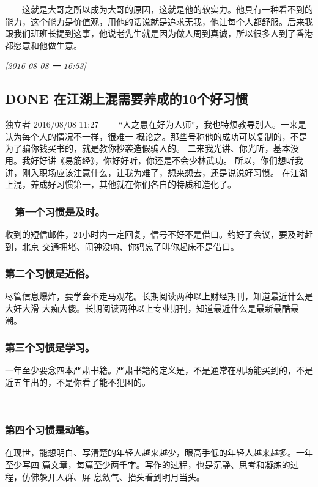 \documentclass[11pt]{ctexart}
\begin{document}
　　这就是大哥之所以成为大哥的原因，这就是他的软实力。他具有一种看不到的能力，这个能力是价值观，用他的话说就是追求无我，他让每个人都舒服。后来我跟我们班班长提到这事，他说老先生就是因为做人周到真诚，所以很多人到了香港都愿意和他做生意。

\textit{[2016-08-08 一 16:53]}

\subsection{{\bfseries\sffamily DONE} 在江湖上混需要养成的10个好习惯}
\label{sec:orgheadline67}
独立者    2016/08/08 11:27
　　“人之患在好为人师”，我也特烦教导别人。一来是认为每个人的情况不一样，很难一
概论之。那些号称他的成功可以复制的，不是为了骗你钱买书的，就是教你抄袭造假骗人的。
二来我光讲、你光听，基本没用。我好好讲《易筋经》，你好好听，你还是不会少林武功。
所以，你们想听我讲，刚入职场应该注意什么，让我为难了，想来想去，还是说说好习惯。
在江湖上混，养成好习惯第一，其他就在你们各自的特质和造化了。

\subsubsection{　第一个习惯是及时。}
\label{sec:orgheadline57}
收到的短信邮件，24小时内一定回复，信号不好不是借口。约好了会议，要及时赶到，北京
交通拥堵、闹钟没响、你妈忘了叫你起床不是借口。

\subsubsection{第二个习惯是近俗。}
\label{sec:orgheadline58}
尽管信息爆炸，要学会不走马观花。长期阅读两种以上财经期刊，知道最近什么是大奸大滑
大痴大傻。长期阅读两种以上专业期刊，知道最近什么是最新最酷最潮。

\subsubsection{第三个习惯是学习。}
\label{sec:orgheadline59}
一年至少要念四本严肃书籍。严肃书籍的定义是，不是通常在机场能买到的，不是近五年出的，不是你看了能不犯困的。

　　

\subsubsection{第四个习惯是动笔。}
\label{sec:orgheadline60}
在现世，能想明白、写清楚的年轻人越来越少，眼高手低的年轻人越来越多。一年至少写四
篇文章，每篇至少两千字。写作的过程，也是沉静、思考和凝练的过程，仿佛躲开人群、屏
息敛气、抬头看到明月当头。
\end{document}
